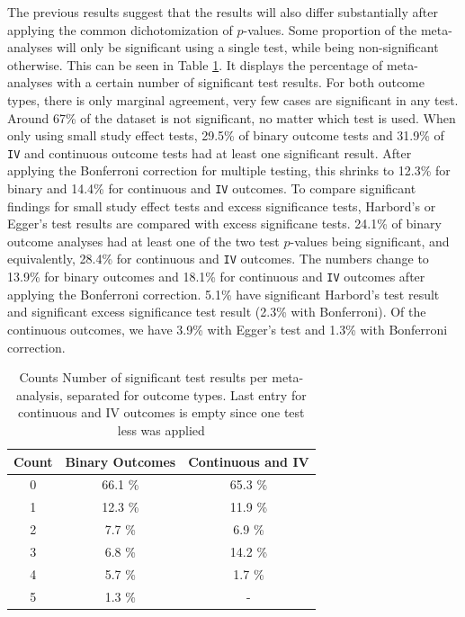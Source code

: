 \documentclass[11pt,a4paper,twoside]{book}\usepackage[]{graphicx}\usepackage[]{color}
\begin{document}
The previous results suggest that the results will also differ substantially after applying the common dichotomization of $p$-values. Some proportion of the meta-analyses will only be significant using a single test, while being non-significant otherwise. This can be seen in Table \ref{number.sig.tests}. It displays the percentage of meta-analyses with a certain number of significant test results. For both outcome types, there is only marginal agreement, very few cases are significant in any test. Around 67\% of the dataset is not significant, no matter which test is used. When only using small study effect tests, 29.5\% of binary outcome tests and 31.9\% of \texttt{IV} and continuous outcome tests had at least one significant result. After applying the Bonferroni correction for multiple testing, this shrinks to 12.3\% for binary and 14.4\% for continuous and \texttt{IV} outcomes. To compare significant findings for small study effect tests and excess significance tests, Harbord's or Egger's test results are compared with excess significane tests. 24.1\% of binary outcome analyses had at least one of the two test $p$-values being significant, and equivalently, 28.4\% for continuous and \texttt{IV} outcomes. The numbers change to 13.9\% for binary outcomes and 18.1\% for continuous and \texttt{IV} outcomes after applying the Bonferroni correction. 5.1\% have significant Harbord's test result and significant excess significance test result  (2.3\% with Bonferroni). Of the continuous outcomes, we have 3.9\% with Egger's test and 1.3\% with Bonferroni correction. \\

\begin{table}[ht]
\centering
\begingroup\footnotesize
\begin{tabular}{ccc}
  \hline
Count & Binary Outcomes & Continuous and IV \\ 
  \hline
0 & 66.1 \% & 65.3 \% \\ 
  1 & 12.3 \% & 11.9 \% \\ 
  2 & 7.7 \% & 6.9 \% \\ 
  3 & 6.8 \% & 14.2 \% \\ 
  4 & 5.7 \% & 1.7 \% \\ 
  5 & 1.3 \% & - \\ 
   \hline
\end{tabular}
\endgroup
\caption{Counts Number of significant test results per meta-analysis, separated
       for outcome types. Last entry for continuous and IV outcomes is empty since one test less was 
       applied} 
\label{number.sig.tests}
\end{table}
\end{document}
